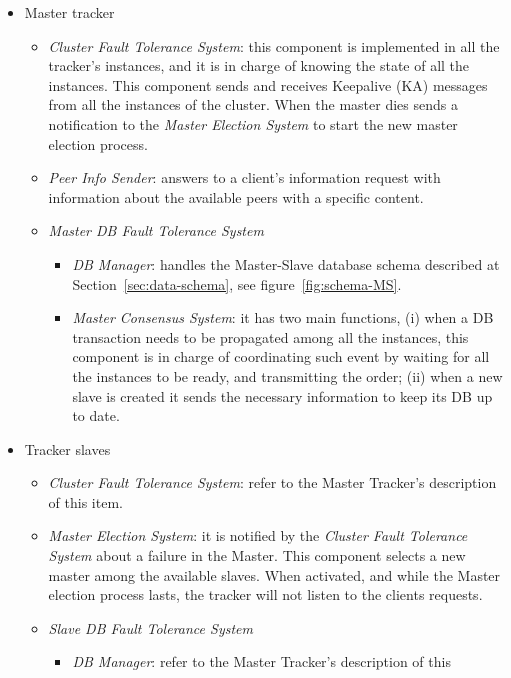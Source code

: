 \documentclass[twoside,a4paper,10pt]{article}
\begin{document}
\begin{itemize}
\item Master tracker
  \begin{itemize}
  \item \emph{Cluster Fault Tolerance System}: this component is implemented
    in all the tracker's instances, and it is in charge of knowing the state
    of all the instances. This component sends and receives Keepalive (KA)
    messages from all the instances of the cluster.
    When the master dies sends a
    notification to the \emph{Master Election System} to start the new master
    election process.
  \item \emph{Peer Info Sender}: answers to a client's information request with
    information about the available peers with a specific content.
  \item \emph{Master DB Fault Tolerance System}
    \begin{itemize}
    \item \emph{DB Manager}: handles the Master-Slave database schema described
      at Section~\ref{sec:data-schema}, see figure~\ref{fig:schema-MS}.
    \item \emph{Master Consensus System}: it has two main functions, (i) when a
      DB transaction needs to be propagated among all the instances,
      this component is in charge of coordinating such event by waiting for all
      the instances to be ready, and transmitting the order; (ii) when a
      new slave is created it sends the necessary information to keep its
      DB up to date.
    \end{itemize}
  \end{itemize}
\item Tracker slaves
  \begin{itemize}
  \item \emph{Cluster Fault Tolerance System}: refer to the Master Tracker's
    description of this item.
  \item \emph{Master Election System}: it is notified by the
    \emph{Cluster Fault Tolerance System} about a failure in the Master. This
    component selects a new master among the available slaves. When activated,
    and while the Master election process lasts, the tracker will not listen to
    the clients requests.
  \item \emph{Slave DB Fault Tolerance System}
    \begin{itemize}
    \item \emph{DB Manager}: refer to the Master Tracker's description of this

\end{itemize}
\end{itemize}
\end{itemize}
\end{document}
